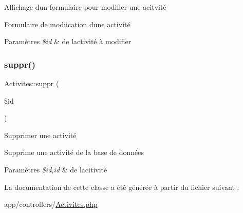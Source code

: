 Affichage d\textquotesingle{}un formulaire pour modifier une acitvité 

Formulaire de modiication d\textquotesingle{}une activité 
\begin{DoxyParams}{Paramètres}
{\em \$id} & de l\textquotesingle{}activité à modifier \\
\hline
\end{DoxyParams}
\mbox{\label{class_activites_a796b62ab25ed2c95932d47759b00013a}} 
\subsubsection{\texorpdfstring{suppr()}{suppr()}}
{\footnotesize\ttfamily Activites\+::suppr (\begin{DoxyParamCaption}\item[{}]{\$id }\end{DoxyParamCaption})}



Supprimer une activité 

Supprime une activité de la base de données 
\begin{DoxyParams}{Paramètres}
{\em \$id,id} & de l\textquotesingle{}acitivité \\
\hline
\end{DoxyParams}


La documentation de cette classe a été générée à partir du fichier suivant \+:\begin{DoxyCompactItemize}
\item 
app/controllers/\hyperlink{_activites_8php}{Activites.\+php}\end{DoxyCompactItemize}
